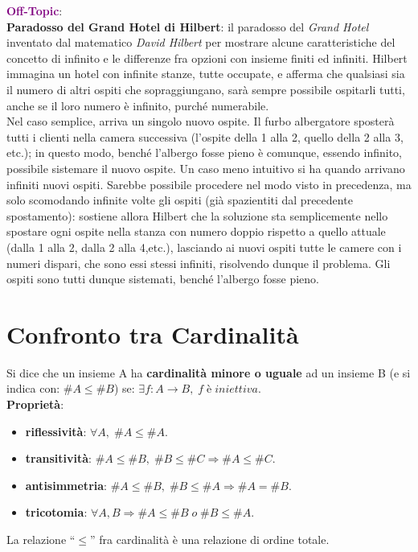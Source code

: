 \begin{boxA}
    \textcolor{purple}{\textbf{Off-Topic}}: \\
    \textbf{Paradosso del Grand Hotel di Hilbert}: il paradosso del \textit{Grand Hotel} inventato dal matematico \textit{David Hilbert} per mostrare alcune caratteristiche del concetto di infinito e le differenze fra opzioni con insieme finiti ed infiniti. Hilbert immagina un hotel con infinite stanze, tutte occupate, e afferma che qualsiasi sia il numero di altri ospiti che sopraggiungano, sarà sempre possibile ospitarli tutti, anche se il loro numero è infinito, purché numerabile. \\
    Nel caso semplice, arriva un singolo nuovo ospite. Il furbo albergatore sposterà tutti i clienti nella camera successiva (l'ospite della 1 alla 2, quello della 2 alla 3, etc.); in questo modo, benché l'albergo fosse pieno è comunque, essendo infinito, possibile sistemare il nuovo ospite.
    Un caso meno intuitivo si ha quando arrivano infiniti nuovi ospiti. Sarebbe possibile procedere nel modo visto in precedenza, ma solo scomodando infinite volte gli ospiti (già spazientiti dal precedente spostamento): sostiene allora Hilbert che la soluzione sta semplicemente nello spostare ogni ospite nella stanza con numero doppio rispetto a quello attuale (dalla 1 alla 2, dalla 2 alla 4,etc.), lasciando ai nuovi ospiti tutte le camere con i numeri dispari, che sono essi stessi infiniti, risolvendo dunque il problema. Gli ospiti sono tutti dunque sistemati, benché l'albergo fosse pieno.
\end{boxA}

\section{Confronto tra Cardinalità}
Si dice che un insieme A ha \textbf{cardinalità minore o uguale} ad un insieme B (e si indica con: $\#A \leq \#B$) se: $\exists f : A \rightarrow B, \; f \; è \; iniettiva$. \\
\textbf{Proprietà}:
\begin{itemize}[nosep]
    \item \textbf{riflessività}: $\forall A, \; \#A \leq \#A$.
    \item \textbf{transitività}: $\#A \leq \#B, \; \#B \leq \#C \Rightarrow \#A \leq \#C$.
    \item \textbf{antisimmetria}: $\#A \leq \#B, \; \#B \leq \#A \Rightarrow \#A = \#B$.
    \item \textbf{tricotomia}: $\forall A, B \Rightarrow \#A \leq \#B \; o \; \#B \leq \#A$.
\end{itemize}
La relazione ``$\leq$'' fra cardinalità è una relazione di ordine totale.


